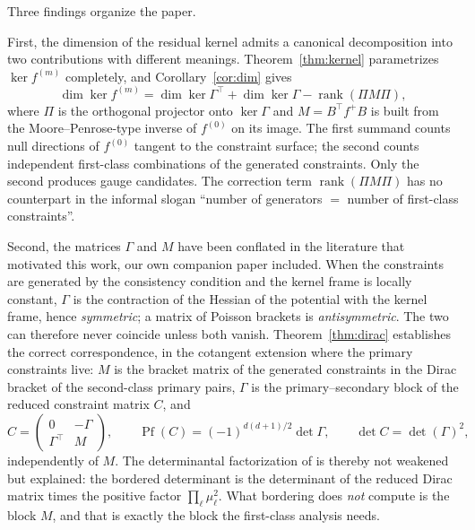 \documentclass[12pt]{article}
\theoremstyle{plain}
\theoremstyle{definition}
\theoremstyle{remark}
\DeclareMathOperator{\rank}{rank}
\DeclareMathOperator{\Pf}{Pf}
\begin{document}
	Three findings organize the paper.
	
	First, the dimension of the residual kernel admits a canonical decomposition
	into two contributions with different meanings.
	Theorem~\ref{thm:kernel} parametrizes $\ker f^{(m)}$ completely, and
	Corollary~\ref{cor:dim} gives
	\begin{equation}
		\dim\ker f^{(m)}
		=\dim\ker\Gamma^{\top}+\dim\ker\Gamma-\rank(\Pi M\Pi),
		\label{eq:intro-dim}
	\end{equation}
	where $\Pi$ is the orthogonal projector onto $\ker\Gamma$ and
	$M=B^{\top}f^{+}B$ is built from the Moore--Penrose-type inverse of $f^{(0)}$ on
	its image. The first summand counts null directions of $f^{(0)}$ tangent to the
	constraint surface; the second counts independent first-class combinations of
	the generated constraints. Only the second produces gauge candidates. The
	correction term $\rank(\Pi M\Pi)$ has no counterpart in the informal slogan
	``number of generators $=$ number of first-class constraints''.
	
	Second, the matrices $\Gamma$ and $M$ have been conflated in the literature that
	motivated this work, our own companion paper included. When the constraints are generated by
	the consistency condition and the kernel frame is locally constant, $\Gamma$ is
	the contraction of the Hessian of the potential with the kernel frame, hence
	\emph{symmetric}; a matrix of Poisson brackets is \emph{antisymmetric}. The two
	can therefore never coincide unless both vanish. Theorem~\ref{thm:dirac}
	establishes the correct correspondence, in the cotangent extension where the
	primary constraints live: $M$ is the bracket matrix of the generated constraints
	in the Dirac bracket of the second-class primary pairs, $\Gamma$ is the
	primary--secondary block of the reduced constraint matrix $C$, and
	\begin{equation}
		C=\begin{pmatrix}0&-\Gamma\\ \Gamma^{\top}&M\end{pmatrix},
		\qquad
		\Pf(C)=(-1)^{d(d+1)/2}\det\Gamma,
		\qquad
		\det C=\det(\Gamma)^{2},
		\label{eq:intro-C}
	\end{equation}
	independently of $M$. The determinantal factorization of \cite{CLMCP2026} is
	thereby not weakened but explained: the bordered determinant is the determinant
	of the reduced Dirac matrix times the positive factor
	$\prod_{\ell}\mu_{\ell}^{2}$. What bordering does \emph{not} compute is the
	block $M$, and that is exactly the block the first-class analysis needs.
	
\end{document}
